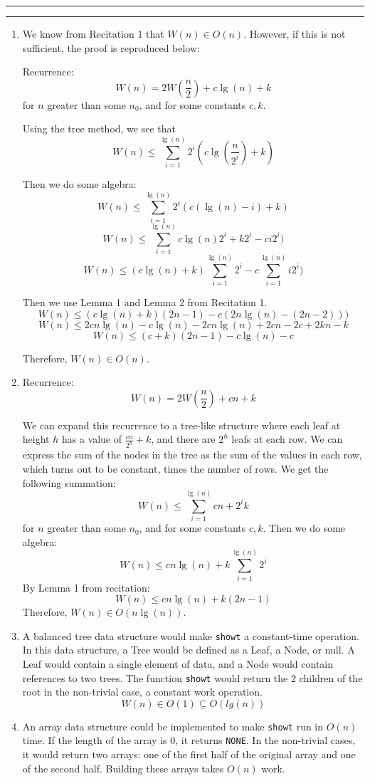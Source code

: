 \documentclass[11pt,letterpaper]{article}
\newcommand{\question}[2] {\vspace{.25in} \hrule\vspace{0.5em}
\noindent{\bf #1: #2} \vspace{0.5em}
\hrule \vspace{.10in}}
\begin{document}
\question{5}{Task 3.4}
\begin{enumerate}
  \item
    We know from Recitation 1 that $W(n) \in O(n)$. However, if this is not sufficient, the proof is reproduced below:

    Recurrence:\\
    $$W(n) = 2W(\frac{n}{2}) + c\lg(n) + k $$
    for $n$ greater than some $n_0$, and for some constants $c,k$. 
    
    Using the tree method, we see that
    $$W(n) \leq \sum_{i=1}^{\lg(n)} 2^{i}( c \lg(\frac{n}{2^i}) + k ) $$ 
    
    Then we do some algebra:
    $$W(n) \leq \sum_{i=1}^{ \lg(n) } 2^{i}( c(\lg(n) - i) + k ) $$ 
    $$W(n) \leq \sum_{i=1}^{ \lg(n) } c \lg(n) 2^{i} + k2^{i} - ci2^{i} ) $$ 
    $$W(n) \leq (c \lg(n) + k) \sum_{i=1}^{ \lg(n) } 2^{i} - c\sum_{i=1}^{ \lg(n) } i2^{i} ) $$ 
    
    Then we use Lemma 1 and Lemma 2 from Recitation 1.
    $$W(n) \leq (c \lg(n) + k) (2n-1) - c(2n\lg(n) - (2n-2)) ) $$ 
    $$W(n) \leq 2cn\lg(n) - c\lg(n) - 2cn\lg(n) + 2cn - 2c + 2kn - k $$ 
    $$W(n) \leq (c+k)(2n-1) - c\lg(n) - c$$ 
    
    Therefore,
      $W(n) \in O(n)$.
  \item
    Recurrence:\\
    $$W(n) = 2W(\frac{n}{2}) + cn + k $$

    We can expand this recurrence to a tree-like structure where each leaf at height $h$ has
    a value of $\frac{cn}{2^h} + k$, and there are $2^h$ leafs at each row. We can express
    the sum of the nodes in the tree as the sum of the values in each row, which turns out to 
    be constant, times the number of rows. We get the following summation: \\

    $$W(n) \leq \sum_{i=1}^{\lg(n)} cn + 2^{i} k  $$ 
    for $n$ greater than some $n_0$, and for some constants $c,k$. Then we do some algebra:
    $$W(n) \leq cn\lg(n) + k\sum_{i=1}^{\lg(n)} 2^{i}  $$ 
    By Lemma 1 from recitation:
    $$W(n) \leq cn\lg(n) + k(2n-1)  $$ 
    Therefore, $W(n) \in O(n\lg(n))$.

  \item
    A balanced tree data structure would make \verb,showt, a constant-time operation.
    In this data structure, a Tree would be defined as a Leaf, a Node, or null. A Leaf 
    would contain a single element of data, and a Node would contain
    references to two trees. The function \verb,showt,  
    would return the 2 children of the root in the non-trivial case, a constant work operation.
    $$W(n) \in O(1) \subseteq O(lg(n))$$
  \item
    An array data structure could be implemented to make \verb|showt| run in $O(n)$ time. 
    If the length of the array is 0, it returns \verb|NONE|. In the non-trivial cases, it would 
    return two arrays: one of the first half of the original array and one of the second half. 
    Building these arrays takes $O(n)$ work.

\end{enumerate}
\end{document}
